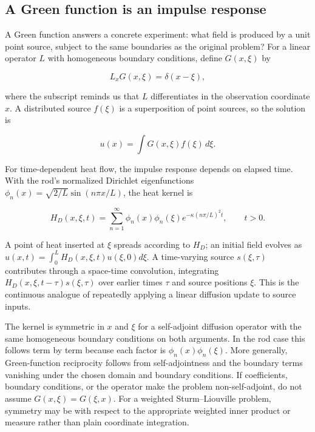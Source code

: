 \subsection{A Green function is an impulse response}\label{04-visual-computing-ii-ch030-a-green-function-is-an-impulse-response}

\hypertarget{04-visual-computing-ii-ch030-a-green-function-is-an-impulse-response}{}

A Green function answers a concrete experiment: what field is produced by a unit point source, subject to the same boundaries as the original problem? For a linear operator \(L\) with homogeneous boundary conditions, define \(G(x,\xi)\) by

\[
L_xG(x,\xi)=\delta(x-\xi),
\]

where the subscript reminds us that \(L\) differentiates in the observation coordinate \(x\). A distributed source \(f(\xi)\) is a superposition of point sources, so the solution is

\[
u(x)=\int G(x,\xi)f(\xi)\,d\xi.
\]

For time-dependent heat flow, the impulse response depends on elapsed time. With the rod's normalized Dirichlet eigenfunctions \(\phi_n(x)=\sqrt{2/L}\sin(n\pi x/L)\), the heat kernel is

\[
H_D(x,\xi,t)=\sum_{n=1}^{\infty}\phi_n(x)\phi_n(\xi)e^{-\kappa(n\pi/L)^2t},\qquad t>0.
\]

A point of heat inserted at \(\xi\) spreads according to \(H_D\); an initial field evolves as \(u(x,t)=\int_0^LH_D(x,\xi,t)u(\xi,0)d\xi\). A time-varying source \(s(\xi,\tau)\) contributes through a space-time convolution, integrating \(H_D(x,\xi,t-\tau)s(\xi,\tau)\) over earlier times \(\tau\) and source positions \(\xi\). This is the continuous analogue of repeatedly applying a linear diffusion update to source inputs.

The kernel is symmetric in \(x\) and \(\xi\) for a self-adjoint diffusion operator with the same homogeneous boundary conditions on both arguments. In the rod case this follows term by term because each factor is \(\phi_n(x)\phi_n(\xi)\). More generally, Green-function reciprocity follows from self-adjointness and the boundary terms vanishing under the chosen domain and boundary conditions. If coefficients, boundary conditions, or the operator make the problem non-self-adjoint, do not assume \(G(x,\xi)=G(\xi,x)\). For a weighted Sturm--Liouville problem, symmetry may be with respect to the appropriate weighted inner product or measure rather than plain coordinate integration.


